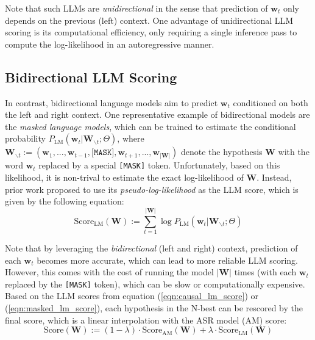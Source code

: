 \documentclass[a4paper]{article}
\begin{document}
Note that such LLMs are \textit{unidirectional} in the sense that prediction of $\bm{w}_t$ only depends on the previous (left) context. One advantage of unidirectional LLM scoring is its computational efficiency, only requiring a single inference pass to compute the log-likelihood in an autoregressive manner.

\subsection{Bidirectional LLM Scoring}
\label{subsec:bidirectional_llm_scoring}

In contrast, bidirectional language models aim to predict $\bm{w}_t$ conditioned on both the left and right context. One representative example of bidirectional models are the \textit{masked language models}, which can be trained to estimate the conditional probability $P_{\mathrm{LM}} (\bm{w}_t | \bm{W}_{\backslash t}; \Theta)$, where $\bm{W}_{\backslash t} := (\bm{w}_1,..., \bm{w}_{t-1}, \texttt{[MASK]}, \bm{w}_{t+1}, ..., \bm{w}_{|\bm{W}|})$ denote the hypothesis $\bm{W}$ with the word $\bm{w}_t$ replaced by a special \texttt{[MASK]} token. Unfortunately, based on this likelihood, it is non-trival to estimate the exact log-likelihood of $\bm{W}$. Instead, prior work proposed to use its \textit{pseudo-log-likelihood} \cite{wang-cho-2019-bert} as the LLM score, which is given by the following equation:
\begin{equation}
\label{eqn:masked_lm_score}
\mathrm{Score}_{\mathrm{LM}}(\bm{W}) := \sum^{|\bm{W}|}_{t=1} \log P_{\mathrm{LM}} (\bm{w}_t | \bm{W}_{\backslash t}; \Theta)
\end{equation}

Note that by leveraging the \textit{bidirectional} (left and right) context, prediction of each $\bm{w}_t$ becomes more accurate, which can lead to more reliable LLM scoring. However, this comes with the cost of running the model $|\bm{W}|$ times (with each $\bm{w}_t$ replaced by the \texttt{[MASK]} token), which can be slow or computationally expensive. \\

Based on the LLM scores from equation (\ref{eqn:causal_lm_score}) or (\ref{eqn:masked_lm_score}), each hypothesis in the N-best can be rescored by the final score, which is a linear interpolation with the ASR model (AM) score:
\begin{equation}
\label{eqn:combined_score}
\mathrm{Score}(\bm{W}) := (1 - \lambda) \cdot \mathrm{Score}_{\mathrm{AM}}(\bm{W}) + \lambda \cdot \mathrm{Score}_{\mathrm{LM}}(\bm{W})
\end{equation}
\end{document}
